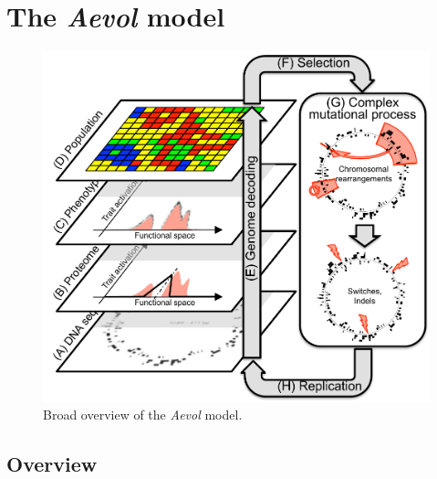 \section{The \emph{Aevol} model}
\label{sec:aevol_model}

\begin{figure}[H]
\includegraphics[width=\textwidth]{aevol/images/aevol.pdf}
\caption[Overview of the \emph{Aevol} model]{Broad overview of the \emph{Aevol} model.}
\label{fig:aevol_model}
\end{figure}

\subsection{Overview}

